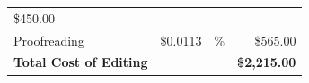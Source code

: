 \documentclass[10pt,openany]{book}
\begin{document}
\begin{longtable}[]{@{}lrrr@{}}
\begin{minipage}[t]{0.22\columnwidth}
\$450.00\strut
\end{minipage}\tabularnewline
\begin{minipage}[t]{0.34\columnwidth}\raggedright
Proofreading\strut
\end{minipage} & \begin{minipage}[t]{0.16\columnwidth}\raggedleft
\$0.0113\strut
\end{minipage} & \begin{minipage}[t]{0.16\columnwidth}\raggedleft
100\%\strut
\end{minipage} & \begin{minipage}[t]{0.22\columnwidth}\raggedleft
\$565.00\strut
\end{minipage}\tabularnewline
\begin{minipage}[t]{0.34\columnwidth}\raggedright
\textbf{Total Cost of Editing}\strut
\end{minipage} & \begin{minipage}[t]{0.16\columnwidth}\raggedleft
\strut
\end{minipage} & \begin{minipage}[t]{0.16\columnwidth}\raggedleft
\strut
\end{minipage} & \begin{minipage}[t]{0.22\columnwidth}\raggedleft
\textbf{\$2,215.00}\strut
\end{minipage}\tabularnewline
\bottomrule
\end{longtable}
\end{document}
